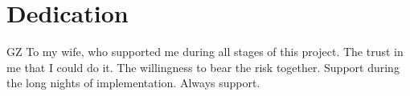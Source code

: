 \chapter*{Dedication}

\begin{authbar}{GZ}
To my wife, who supported me during all stages of this project. 
The trust in me that I could do it. 
The willingness to bear the risk together.
Support during the long nights of implementation.
Always support.
\end{authbar}

